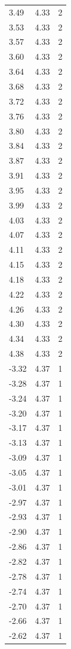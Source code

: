 \begin{longtable}{lrr}
  3.49 & 4.33 & 2 \\
  3.53 & 4.33 & 2 \\
  3.57 & 4.33 & 2 \\
  3.60 & 4.33 & 2 \\
  3.64 & 4.33 & 2 \\
  3.68 & 4.33 & 2 \\
  3.72 & 4.33 & 2 \\
  3.76 & 4.33 & 2 \\
  3.80 & 4.33 & 2 \\
  3.84 & 4.33 & 2 \\
  3.87 & 4.33 & 2 \\
  3.91 & 4.33 & 2 \\
  3.95 & 4.33 & 2 \\
  3.99 & 4.33 & 2 \\
  4.03 & 4.33 & 2 \\
  4.07 & 4.33 & 2 \\
  4.11 & 4.33 & 2 \\
  4.15 & 4.33 & 2 \\
  4.18 & 4.33 & 2 \\
  4.22 & 4.33 & 2 \\
  4.26 & 4.33 & 2 \\
  4.30 & 4.33 & 2 \\
  4.34 & 4.33 & 2 \\
  4.38 & 4.33 & 2 \\
  -3.32 & 4.37 & 1 \\
  -3.28 & 4.37 & 1 \\
  -3.24 & 4.37 & 1 \\
  -3.20 & 4.37 & 1 \\
  -3.17 & 4.37 & 1 \\
  -3.13 & 4.37 & 1 \\
  -3.09 & 4.37 & 1 \\
  -3.05 & 4.37 & 1 \\
  -3.01 & 4.37 & 1 \\
  -2.97 & 4.37 & 1 \\
  -2.93 & 4.37 & 1 \\
  -2.90 & 4.37 & 1 \\
  -2.86 & 4.37 & 1 \\
  -2.82 & 4.37 & 1 \\
  -2.78 & 4.37 & 1 \\
  -2.74 & 4.37 & 1 \\
  -2.70 & 4.37 & 1 \\
  -2.66 & 4.37 & 1 \\
  -2.62 & 4.37 & 1 \\

\end{longtable}
